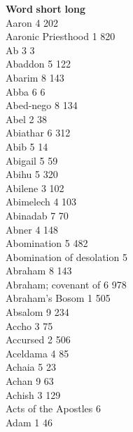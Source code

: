 \noindent
\textbf{Word}  \hfill \textbf{short} \quad \textbf{long}\\
Aaron \hfill 4 \quad \phantom{0}202\\
Aaronic Priesthood \hfill 1 \quad \phantom{0}820\\
Ab \hfill 3 \quad \phantom{0}\phantom{0}\phantom{0}3\\
Abaddon \hfill 5 \quad \phantom{0}122\\
Abarim \hfill 8 \quad \phantom{0}143\\
Abba \hfill 6 \quad \phantom{0}\phantom{0}\phantom{0}6\\
Abed-nego \hfill 8 \quad \phantom{0}134\\
Abel \hfill 2 \quad \phantom{0}\phantom{0}38\\
Abiathar \hfill 6 \quad \phantom{0}312\\
Abib \hfill 5 \quad \phantom{0}\phantom{0}14\\
Abigail \hfill 5 \quad \phantom{0}\phantom{0}59\\
Abihu \hfill 5 \quad \phantom{0}320\\
Abilene \hfill 3 \quad \phantom{0}102\\
Abimelech \hfill 4 \quad \phantom{0}103\\
Abinadab \hfill 7 \quad \phantom{0}\phantom{0}70\\
Abner \hfill 4 \quad \phantom{0}148\\
Abomination \hfill 5 \quad \phantom{0}482\\
Abomination of desolation
\mbox{} \hfill 5 \\
Abraham \hfill 8 \quad \phantom{0}143\\
Abraham; covenant of \hfill 6 \quad \phantom{0}978\\
Abraham’s Bosom \hfill 1 \quad \phantom{0}505\\
Absalom \hfill 9 \quad \phantom{0}234\\
Accho \hfill 3 \quad \phantom{0}\phantom{0}75\\
Accursed \hfill 2 \quad \phantom{0}506\\
Aceldama \hfill 4 \quad \phantom{0}\phantom{0}85\\
Achaia \hfill 5 \quad \phantom{0}\phantom{0}23\\
Achan \hfill 9 \quad \phantom{0}\phantom{0}63\\
Achish \hfill 3 \quad \phantom{0}129\\
Acts of the Apostles \hfill 6 \\
Adam \hfill 1 \quad \phantom{0}\phantom{0}46\\
